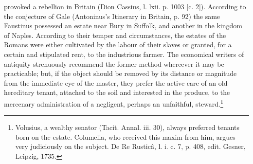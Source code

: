 {provoked a rebellion in Britain (Dion Cassius, l. lxii. p. 1003 [c. 2]). According to the conjecture of Gale (Antoninus\texthebrew{}’s Itinerary in Britain, p. 92) the same Faustinus possessed an estate near Bury in Suffolk, and another in the kingdom of Naples.} According to their temper and circumstances, the estates of the Romans were either cultivated by the labour of their slaves or granted, for a certain and stipulated rent, to the industrious farmer. The economical writers of antiquity strenuously recommend the former method whereever it may be practicable; but, if the object should be removed by its distance or magnitude from the immediate eye of the master, they prefer the active care of an old hereditary tenant, attached to the soil and interested in the produce, to the mercenary administration of a negligent, perhaps an unfaithful, steward.\footnote{Volusius, a wealthy senator (Tacit. Annal. iii. 30), always preferred tenants born on the estate. Columella, who received this maxim from him, argues very judiciously on the subject. De Re Rusticâ, l. i. c. 7, p. 408, edit. Gesner, Leipzig, 1735.}

